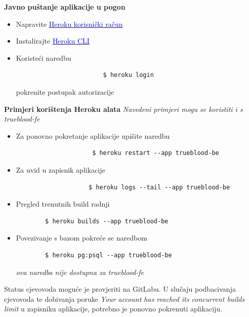 			\textbf{Javno puštanje aplikacije u pogon}
    			\begin{itemize}
    			    \item Napravite \href{https://signup.heroku.com/}{\textcolor{blue}{Heroku korisnički račun}}
    			    \item Instalirajte \href{https://devcenter.heroku.com/articles/heroku-cli}{\textcolor{blue}{Heroku CLI}}
    			    \item Koristeći naredbu 
    			    \begin{verbatim}
    			        $ heroku login
    			    \end{verbatim}
    			    pokrenite postupak autorizacije
			    \end{itemize}
    			 \textbf{Primjeri korištenja Heroku alata} \newline
    			 \textit{Navedeni primjeri mogu se koristiti i s trueblood-fe}
    			 \begin{itemize}
    			 \item Za ponovno pokretanje aplikacije upišite naredbu
    			 \begin{verbatim}
    			     $ heroku restart --app trueblood-be
    			 \end{verbatim}
    			 \item Za uvid u zapisnik aplikacije
    			 \begin{verbatim}
    			    $ heroku logs --tail --app trueblood-be
    			 \end{verbatim}

                \item Pregled trenutnih build radnji
                \begin{verbatim}
        $ heroku builds --app trueblood-be
                \end{verbatim}
                
                \item Povezivanje s bazom pokreće se naredbom
                \begin{verbatim}
        $ heroku pg:psql --app trueblood-be
                \end{verbatim}
                \textit{ova naredba nije dostupna za trueblood-fe}
    			\end{itemize}
    		Status cjevovoda moguće je provjeriti na GitLabu. U slučaju podbacivanja cjevovoda te dobivanja poruke \textit{Your account has reached its concurrent builds limit} u zapisniku aplikacije, potrebno je ponovno pokrenuti aplikaciju.
			\eject 
